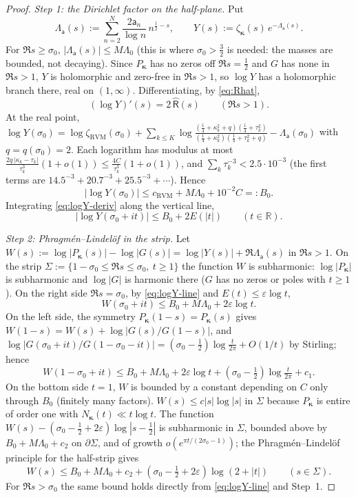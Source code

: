 \documentclass[11pt]{article}
\newcommand{\RVM}{\mathrm{RVM}}
\begin{document}
\begin{proof}
\emph{Step 1: the Dirichlet factor on the half-plane.} Put
\[
 \Lambda_{\mathsf a}(s):=\sum_{n=2}^{N}\frac{2\mathsf a_n}{\log n}\,n^{\frac12-s},\qquad
 Y(s):=\zeta_{\boldsymbol\kappa}(s)\,e^{-\Lambda_{\mathsf a}(s)}.
\]
For $\Re s\ge\sigma_0$, $|\Lambda_{\mathsf a}(s)|\le M\Lambda_0$ (this is where $\sigma_0>\frac32$ is needed: the masses are bounded, not decaying). Since $P_{\boldsymbol\kappa}$ has no zeros off $\Re s=\frac12$ and $G$ has none in $\Re s>1$, $Y$ is holomorphic and zero-free in $\Re s>1$, so $\log Y$ has a holomorphic branch there, real on $(1,\infty)$. Differentiating, by \eqref{eq:Rhat},
\begin{equation}\label{eq:logY-deriv}
 (\log Y)'(s)=2\,\widehat{\mathsf R}(s)\qquad(\Re s>1).
\end{equation}
At the real point, $\log Y(\sigma_0)=\log\zeta_{\RVM}(\sigma_0)+\sum_{k\le K}\log\frac{(\frac14+\kappa_k^2+q)(\frac14+\tau_k^2)}{(\frac14+\kappa_k^2)(\frac14+\tau_k^2+q)}-\Lambda_{\mathsf a}(\sigma_0)$ with $q=q(\sigma_0)=2$. Each logarithm has modulus at most $\frac{2q\,|\kappa_k-\tau_k|}{\tau_k^3}(1+o(1))\le\frac{4C}{\tau_k^3}(1+o(1))$, and $\sum_k\tau_k^{-3}<2.5\cdot10^{-3}$ (the first terms are $14.5^{-3}+20.7^{-3}+25.5^{-3}+\cdots$). Hence
\[
 |\log Y(\sigma_0)|\le c_{\RVM}+M\Lambda_0+10^{-2}C=:B_0 .
\]
Integrating \eqref{eq:logY-deriv} along the vertical line,
\begin{equation}\label{eq:logY-line}
 |\log Y(\sigma_0+it)|\le B_0+2E(|t|)\qquad(t\in\mathbb R).
\end{equation}

\emph{Step 2: Phragm\'en--Lindel\"of in the strip.} Let $W(s):=\log|P_{\boldsymbol\kappa}(s)|-\log|G(s)|=\log|Y(s)|+\Re\Lambda_{\mathsf a}(s)$ in $\Re s>1$. On the strip $\Sigma:=\{1-\sigma_0\le\Re s\le\sigma_0,\ t\ge1\}$ the function $W$ is subharmonic: $\log|P_{\boldsymbol\kappa}|$ is subharmonic and $\log|G|$ is harmonic there ($G$ has no zeros or poles with $t\ge1$). On the right side $\Re s=\sigma_0$, by \eqref{eq:logY-line} and $E(t)\le\varepsilon\log t$,
\[
 W(\sigma_0+it)\le B_0+M\Lambda_0+2\varepsilon\log t .
\]
On the left side, the symmetry $P_{\boldsymbol\kappa}(1-s)=P_{\boldsymbol\kappa}(s)$ gives $W(1-s)=W(s)+\log|G(s)/G(1-s)|$, and $\log|G(\sigma_0+it)/G(1-\sigma_0-it)|=(\sigma_0-\tfrac12)\log\frac t{2\pi}+O(1/t)$ by Stirling; hence
\[
 W(1-\sigma_0+it)\le B_0+M\Lambda_0+2\varepsilon\log t+(\sigma_0-\tfrac12)\log\tfrac t{2\pi}+c_1 .
\]
On the bottom side $t=1$, $W$ is bounded by a constant depending on $C$ only through $B_0$ (finitely many factors). $W(s)\le c|s|\log|s|$ in $\Sigma$ because $P_{\boldsymbol\kappa}$ is entire of order one with $N_{\boldsymbol\kappa}(t)\ll t\log t$. The function $W(s)-(\sigma_0-\tfrac12+2\varepsilon)\log|s-\tfrac12|$ is subharmonic in $\Sigma$, bounded above by $B_0+M\Lambda_0+c_2$ on $\partial\Sigma$, and of growth $o(e^{\pi t/(2\sigma_0-1)})$; the Phragm\'en--Lindel\"of principle for the half-strip gives
\begin{equation}\label{eq:W-strip}
 W(s)\le B_0+M\Lambda_0+c_2+(\sigma_0-\tfrac12+2\varepsilon)\log(2+|t|)\qquad(s\in\Sigma).
\end{equation}
For $\Re s>\sigma_0$ the same bound holds directly from \eqref{eq:logY-line} and Step~1.


\end{proof}
\end{document}
